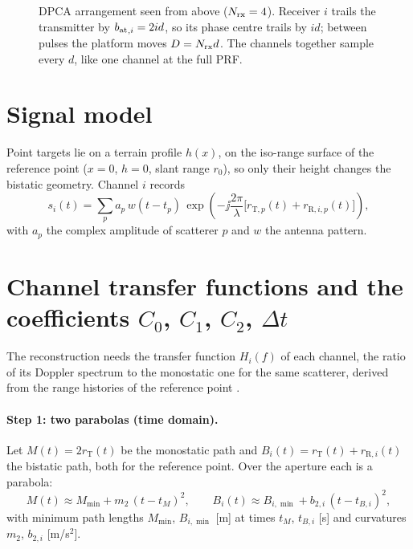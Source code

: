 \begin{figure}[htbp]
\centering

\caption[DPCA arrangement]{DPCA arrangement seen from above (${N_{\mathrm{rx}}}=4$). Receiver $i$ trails the transmitter by
${b_{\mathrm{at}}}_{,i}=2id$, so its phase centre trails by $id$; between pulses the platform moves $D={N_{\mathrm{rx}}} d$. The channels together
sample every $d$, like one channel at the full PRF.}
\label{fig:dpca}
\end{figure}

\section{Signal model}

Point targets lie on a terrain profile $h(x)$, on the iso-range surface of the reference point ($x=0$, $h=0$, slant range
$r_0$), so only their height changes the bistatic geometry. Channel $i$ records
\begin{equation}
  s_i(t) = \sum_{p} a_p\, w(t-t_p)\, \exp\!\left(-\jj\frac{2\pi}{\lambda} \bigl[r_{\mathrm T,p}(t)+r_{\mathrm R,i,p}(t)\bigr]\right),
\end{equation}
with $a_p$ the complex amplitude of scatterer $p$ and $w$ the antenna pattern.

\section{Channel transfer functions and the coefficients \texorpdfstring{$C_0$, $C_1$, $C_2$, $\Delta t$}{C0, C1, C2, Delta t}}\label{sec:coeffs}

The reconstruction needs the transfer function $H_i(f)$ of each channel, the ratio of its Doppler spectrum to the monostatic
one for the same scatterer, derived from the range histories of the reference point \cite{Sakar2020tgrs,Sakar2022thesis}.

\paragraph{Step 1: two parabolas (time domain).} Let $M(t)=2r_{\mathrm T}(t)$ be the monostatic path and
$B_i(t)=r_{\mathrm T}(t)+r_{\mathrm R,i}(t)$ the bistatic path, both for the reference point. Over the aperture each is a
parabola:
\begin{equation}
  M(t)\approx M_{\min}+m_2\,(t-t_M)^2, \qquad B_i(t)\approx B_{i,\min}+b_{2,i}\,(t-t_{B,i})^2 ,
  \label{eq:parabolas}
\end{equation}
with minimum path lengths $M_{\min}$, $B_{i,\min}$ [m] at times $t_M$, $t_{B,i}$ [s] and curvatures $m_2$, $b_{2,i}$
[m/s$^2$].

